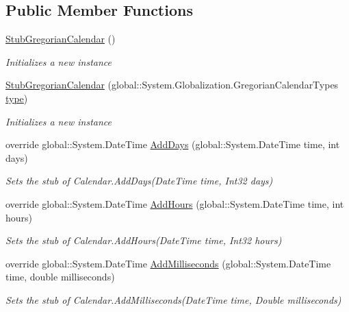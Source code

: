 \subsection*{Public Member Functions}
\begin{DoxyCompactItemize}
\item 
\hyperlink{class_system_1_1_globalization_1_1_fakes_1_1_stub_gregorian_calendar_a91a4ae7315969216c6564f8ed7cf5c5c}{Stub\-Gregorian\-Calendar} ()
\begin{DoxyCompactList}\small\item\em Initializes a new instance\end{DoxyCompactList}\item 
\hyperlink{class_system_1_1_globalization_1_1_fakes_1_1_stub_gregorian_calendar_a1e8fee885a9a2174281b334bbd618974}{Stub\-Gregorian\-Calendar} (global\-::\-System.\-Globalization.\-Gregorian\-Calendar\-Types \hyperlink{jquery-1_810_82-vsdoc_8js_a3940565e83a9bfd10d95ffd27536da91}{type})
\begin{DoxyCompactList}\small\item\em Initializes a new instance\end{DoxyCompactList}\item 
override global\-::\-System.\-Date\-Time \hyperlink{class_system_1_1_globalization_1_1_fakes_1_1_stub_gregorian_calendar_a1c86742fd7335c6340744f29de02dfdd}{Add\-Days} (global\-::\-System.\-Date\-Time time, int days)
\begin{DoxyCompactList}\small\item\em Sets the stub of Calendar.\-Add\-Days(\-Date\-Time time, Int32 days)\end{DoxyCompactList}\item 
override global\-::\-System.\-Date\-Time \hyperlink{class_system_1_1_globalization_1_1_fakes_1_1_stub_gregorian_calendar_aa5bc572aaf454444b42d333032f38786}{Add\-Hours} (global\-::\-System.\-Date\-Time time, int hours)
\begin{DoxyCompactList}\small\item\em Sets the stub of Calendar.\-Add\-Hours(\-Date\-Time time, Int32 hours)\end{DoxyCompactList}\item 
override global\-::\-System.\-Date\-Time \hyperlink{class_system_1_1_globalization_1_1_fakes_1_1_stub_gregorian_calendar_a00ff43f634fa36ac8da9cc34d6bf0549}{Add\-Milliseconds} (global\-::\-System.\-Date\-Time time, double milliseconds)
\begin{DoxyCompactList}\small\item\em Sets the stub of Calendar.\-Add\-Milliseconds(\-Date\-Time time, Double milliseconds)\end{DoxyCompactList}\item 

\end{DoxyCompactItemize}
